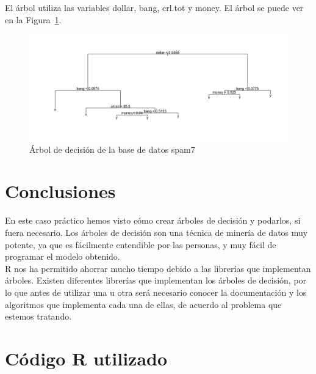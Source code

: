 \documentclass[12pt,a4paper,twoside,openright,titlepage,final]{article}
\begin{document}
El árbol utiliza las variables dollar, bang, crl.tot y money. El árbol se puede ver en la Figura~\ref{fig:spam_plot}.\\

\begin{figure}[tbph!]
\centering
\includegraphics[width=0.9\linewidth]{imagenes/spam_plot}
\caption{Árbol de decisión de la base de datos spam7}
\label{fig:spam_plot}
\end{figure}

\section{Conclusiones}

En este caso práctico hemos visto cómo crear árboles de decisión y podarlos, si fuera necesario. Los árboles de decisión son una técnica de minería de datos muy potente, ya que es fácilmente entendible por las personas, y muy fácil de programar el modelo obtenido.\\

R nos ha permitido ahorrar mucho tiempo debido a las librerías que implementan árboles. Existen diferentes librerías que implementan los árboles de decisión, por lo que antes de utilizar una u otra será necesario conocer la documentación y los algoritmos que implementa cada una de ellas, de acuerdo al problema que estemos tratando. 

\clearpage

\section{Código R utilizado}


\end{document}
